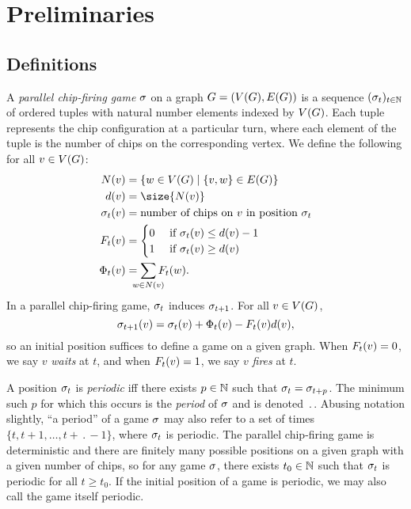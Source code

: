 \section{Preliminaries} \label{pres}

\subsection*{Definitions}
A \emph{parallel chip-firing game} $\sigma$ on a graph $G = (V(G), E(G))$ is a sequence
$(\sigma_{t})_{t \in \mathbb{N}}$ of ordered tuples with natural number elements
indexed by $V(G)$. Each tuple represents the chip configuration at a particular
turn, where each element of the tuple is the number of chips on the
corresponding vertex. We define the following for all $v \in V(G)$:
\begin{align*}
  \N{v} &= \set{w \in \V}{\{v,w\} \in \E} \\
  \deg{v} &= \size{\N{v}} \\
  \chips{v}{t} &= \text{number of chips on $v$ in position $\pos{t}$} \\
  \firing{v}{t} &= \begin{cases}
    0 &\text{ if } \chips{v}{t} \leq \deg[]{v} - 1 \\
    1 &\text{ if } \chips{v}{t} \geq \deg[]{v}
  \end{cases} \\
  \receiving{v}{t} &= \sum_{\mathclap{w \in \N{v}}} \firing{w}{t}.
\end{align*}
In a parallel chip-firing game, $\sigma_{t}$ induces $\sigma_{t+1}$. For all $v \in
V(G)$,
\begin{equation}\label{gameDef}
  \chips{v}{t+1} = \chips{v}{t} + \receiving{v}{t} - \firing{v}{t}\deg[]{v},
\end{equation}
so an initial position suffices to define a game on a given graph. When
$\firing{v}{t} = 0$, we say $v$ \emph{waits} at $t$, and when $\firing{v}{t} =
1$, we say $v$ \emph{fires} at $t$.

A position $\sigma_{t}$ is \emph{periodic} iff there exists $p \in \mathbb{N}$ such
that $\sigma_{t} = \sigma_{t+p}$. The minimum such $p$ for which this occurs is the
\emph{period} of $\sigma$ and is denoted $\period$. Abusing notation slightly, ``a
period'' of a game $\sigma$ may also refer to a set of times $\{t, t+1, \dots,
t+\period-1\}$, where $\sigma_{t}$ is periodic. The parallel chip-firing game is
deterministic and there are finitely many possible positions on a given graph
with a given number of chips, so for any game $\sigma$, there exists $t_0 \in
\mathbb{N}$ such that $\sigma_{t}$ is periodic for all $t \geq t_0$. If the initial
position of a game is periodic, we may also call the game itself periodic.

